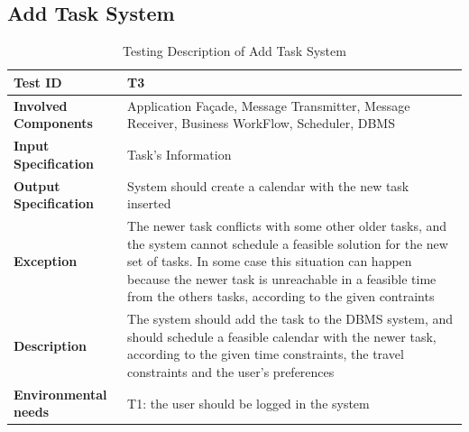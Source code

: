 \subsection*{Add Task System}

\begin{table}[H]
    \centering
    \begin{tabular}{p{4.55cm} p{7cm}}
        
        \hline
        
        \textbf{Test ID}                & T3 \\
        
        \hline
        
        \textbf{Involved Components}    & Application Façade, Message Transmitter, Message Receiver, Business                                          WorkFlow, Scheduler, DBMS\\
        
        \hline
        
        \textbf{Input Specification}    & Task's Information\\
        
        \hline
        
        \textbf{Output Specification}   & System should create a calendar with the new task inserted\\
        
        \hline
        
        \textbf{Exception}              & The newer task conflicts with some other older tasks, and the system cannot schedule a feasible solution for the new set of tasks. In some case this situation can happen because the newer task is unreachable in a feasible time from the others tasks, according to the given contraints\\
        
        \hline
        
        \textbf{Description}            & The system should add the task to the DBMS system, and should schedule a feasible calendar with the newer task, according to the given time constraints, the travel constraints and the user's preferences\\
        \hline
        
        \textbf{Environmental needs}    & T1: the user should be logged in the system\\
        
        \hline
        
    \end{tabular}
    \caption{Testing Description of Add Task System}
\end{table}




